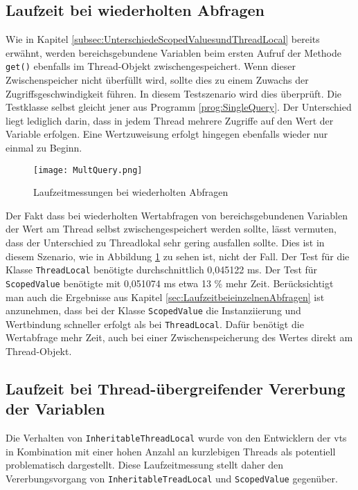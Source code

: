 \subsection{Laufzeit bei wiederholten Abfragen}
\label{sec:LaufzeitbeiwiederholtenAbfragen}

    Wie in Kapitel \ref{subsec:UnterschiedeScopedValuesundThreadLocal} bereits erwähnt, werden bereichsgebundene Variablen beim ersten Aufruf der Methode \texttt{get()} ebenfalls im Thread-Objekt 
    zwischengespeichert. Wenn dieser Zwischenspeicher nicht überfüllt wird, sollte dies zu einem Zuwachs der Zugriffsgeschwindigkeit führen. In diesem Testszenario wird dies überprüft.
    Die Testklasse selbst gleicht jener aus Programm \ref{prog:SingleQuery}. Der Unterschied liegt lediglich darin, dass in jedem Thread mehrere Zugriffe auf den Wert der Variable erfolgen. Eine 
    Wertzuweisung erfolgt hingegen ebenfalls wieder nur einmal zu Beginn.


    \begin{figure}[H]
        \centering
        \texttt{[image: MultQuery.png]}
        \caption{Laufzeitmessungen bei wiederholten Abfragen}
        \label{fig:MultQuery}
    \end{figure}

    Der Fakt dass bei wiederholten Wertabfragen von bereichsgebundenen Variablen der Wert am Thread selbst zwischengespeichert werden sollte, lässt vermuten, dass der Unterschied zu Threadlokal 
    sehr gering ausfallen sollte. Dies ist in diesem Szenario, wie in Abbildung \ref{fig:MultQuery} zu sehen ist, nicht der Fall. Der Test für die Klasse \texttt{ThreadLocal} benötigte
    durchschnittlich 0,045122 ms. Der Test für \texttt{ScopedValue} benötigte mit 0,051074 ms etwa 13 \% mehr Zeit. Berücksichtigt man auch die Ergebnisse aus Kapitel \ref{sec:LaufzeitbeieinzelnenAbfragen}
    ist anzunehmen, dass bei der Klasse \texttt{ScopedValue} die Instanziierung und Wertbindung schneller erfolgt als bei \texttt{ThreadLocal}. Dafür benötigt die Wertabfrage mehr Zeit, auch bei einer 
    Zwischenspeicherung des Wertes direkt am Thread-Objekt.

\subsection{Laufzeit bei Thread-übergreifender Vererbung der Variablen}
\label{sec:LaufzeitbeiVererbung}
    Die Verhalten von \texttt{InheritableThreadLocal} wurde von den Entwicklern der \Glspl{vt} in Kombination mit einer hohen Anzahl an kurzlebigen Threads als potentiell problematisch 
    dargestellt. Diese Laufzeitmessung stellt daher den Vererbungsvorgang von \texttt{InheritableTreadLocal} und \texttt{ScopedValue} gegenüber.

